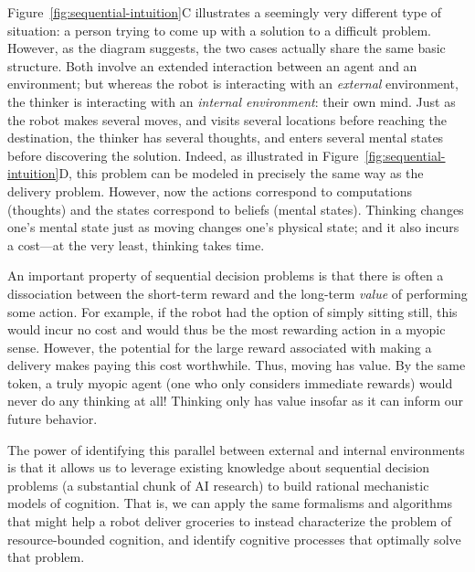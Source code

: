 Figure~\ref{fig:sequential-intuition}C illustrates a seemingly very different type of situation: a person trying to come up with a solution to a difficult problem. However, as the diagram suggests, the two cases actually share the same basic structure. Both involve an extended interaction between an agent and an environment; but whereas the robot is interacting with an \emph{external} environment, the thinker is interacting with an \emph{internal environment}: their own mind. Just as the robot makes several moves, and visits several locations before reaching the destination, the thinker has several thoughts, and enters several mental states before discovering the solution. Indeed, as illustrated in Figure~\ref{fig:sequential-intuition}D, this problem can be modeled in precisely the same way as the delivery problem. However, now the actions correspond to computations (thoughts) and the states correspond to beliefs (mental states). Thinking changes one's mental state just as moving changes one's physical state; and it also incurs a cost---at the very least, thinking takes time.

An important property of sequential decision problems is that there is often a dissociation between the short-term reward and the long-term \emph{value} of performing some action. For example, if the robot had the option of simply sitting still, this would incur no cost and would thus be the most rewarding action in a myopic sense. However, the potential for the large reward associated with making a delivery makes paying this cost worthwhile. Thus, moving has value. By the same token, a truly myopic agent (one who only considers immediate rewards) would never do any thinking at all! Thinking only has value insofar as it can inform our future behavior.\footnotemark{}


The power of identifying this parallel between external and internal environments is that it allows us to leverage existing knowledge about sequential decision problems (a substantial chunk of AI research) to build rational mechanistic models of cognition. That is, we can apply the same formalisms and algorithms that might help a robot deliver groceries to instead characterize the problem of resource-bounded cognition, and identify cognitive processes that optimally solve that problem.


